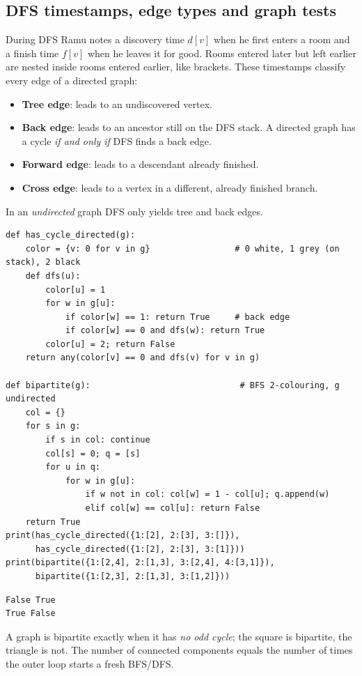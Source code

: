 \documentclass[11pt,a4paper]{article}
\begin{document}
\subsection{DFS timestamps, edge types and graph tests}
\begin{story}
During DFS Ramu notes a discovery time $d[v]$ when he first enters a room and a finish time $f[v]$ when he leaves it for good. Rooms entered later but left earlier are nested inside rooms entered earlier, like brackets. These timestamps classify every edge of a directed graph:
\end{story}
\begin{itemize}[noitemsep]
\item \textbf{Tree edge}: leads to an undiscovered vertex.
\item \textbf{Back edge}: leads to an ancestor still on the DFS stack. A directed graph has a cycle \emph{if and only if} DFS finds a back edge.
\item \textbf{Forward edge}: leads to a descendant already finished.
\item \textbf{Cross edge}: leads to a vertex in a different, already finished branch.
\end{itemize}
In an \emph{undirected} graph DFS only yields tree and back edges.
\begin{lstlisting}
def has_cycle_directed(g):
    color = {v: 0 for v in g}                 # 0 white, 1 grey (on stack), 2 black
    def dfs(u):
        color[u] = 1
        for w in g[u]:
            if color[w] == 1: return True     # back edge
            if color[w] == 0 and dfs(w): return True
        color[u] = 2; return False
    return any(color[v] == 0 and dfs(v) for v in g)

def bipartite(g):                              # BFS 2-colouring, g undirected
    col = {}
    for s in g:
        if s in col: continue
        col[s] = 0; q = [s]
        for u in q:
            for w in g[u]:
                if w not in col: col[w] = 1 - col[u]; q.append(w)
                elif col[w] == col[u]: return False
    return True
print(has_cycle_directed({1:[2], 2:[3], 3:[]}),
      has_cycle_directed({1:[2], 2:[3], 3:[1]}))
print(bipartite({1:[2,4], 2:[1,3], 3:[2,4], 4:[3,1]}),
      bipartite({1:[2,3], 2:[1,3], 3:[1,2]}))
\end{lstlisting}
\begin{lstlisting}[style=out]
False True
True False
\end{lstlisting}
A graph is bipartite exactly when it has \emph{no odd cycle}; the square is bipartite, the triangle is not. The number of connected components equals the number of times the outer loop starts a fresh BFS/DFS.
\end{document}
